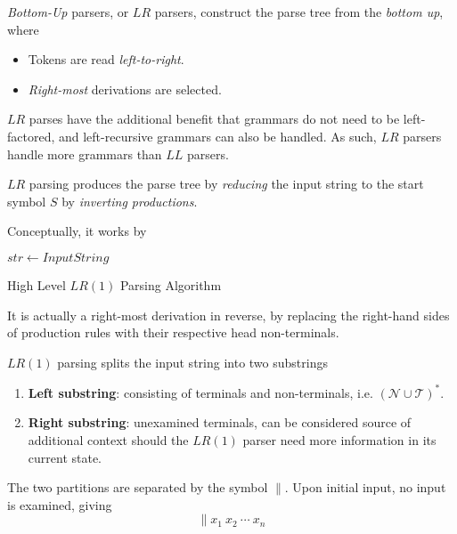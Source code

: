\begin{definition}[LR Parsing]
    \textit{Bottom-Up} parsers, or $LR$ parsers, construct the parse tree from the \textit{bottom up}, where
    \begin{itemize}
        \item Tokens are read \textit{left-to-right}.
        \item \textit{Right-most} derivations are selected.
    \end{itemize}
    
    $LR$ parses have the additional benefit that grammars do not need to be left-factored, and left-recursive grammars can also be handled. As such, $LR$ parsers handle more grammars than $LL$ parsers.
\end{definition}

\begin{definition}
    $LR$ parsing produces the parse tree by \textit{reducing} the input string to the start symbol $S$ by \textit{inverting productions}.
    
    Conceptually, it works by
    \begin{algorithm}[H]
        \begin{algorithmic}
                \State $str \gets InputString$
                \Repeat
                 
            \EndProcedure
        \end{algorithmic}
        \caption{High Level $LR(1)$ Parsing Algorithm}
        \label{prog:high-level-lr1-parsing}
    \end{algorithm}
    
    It is actually a right-most derivation in reverse, by replacing the right-hand sides of production rules with their respective head non-terminals.
\end{definition}

\begin{definition}
    $LR(1)$ parsing splits the input string into two substrings
    \begin{enumerate}
        \item \textbf{Left substring}: consisting of terminals and non-terminals, i.e. $(\mathcal{N} \cup \mathcal{T})^\ast$.
        \item \textbf{Right substring}: unexamined terminals, can be considered source of additional context should the $LR(1)$ parser need more information in its current state.
    \end{enumerate}
    
    The two partitions are separated by the symbol $\parallel$. Upon initial input, no input is examined, giving
    \begin{equation}
        \parallel x_1\ x_2\ \cdots\ x_n
    \end{equation}
\end{definition}

